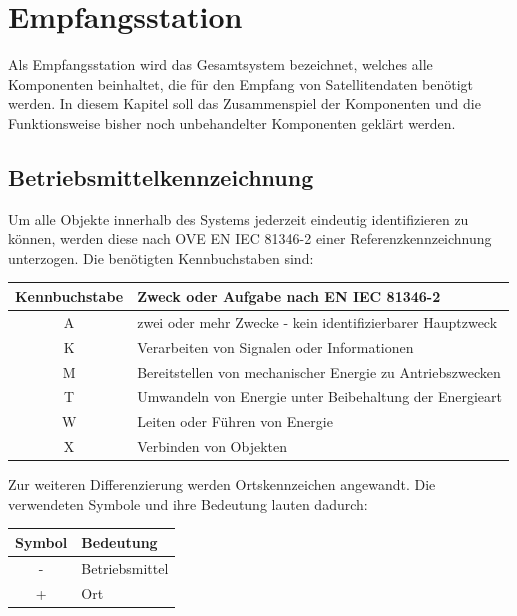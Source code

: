 \chapter{Empfangsstation}
Als Empfangsstation wird das Gesamtsystem bezeichnet, welches alle Komponenten beinhaltet, die für den Empfang von Satellitendaten benötigt werden. In diesem Kapitel soll das Zusammenspiel der Komponenten und die Funktionsweise bisher noch unbehandelter Komponenten geklärt werden.

\section{Betriebsmittelkennzeichnung}
\label{sec:bmk}
Um alle Objekte innerhalb des Systems jederzeit eindeutig identifizieren zu können, werden diese nach OVE EN IEC 81346-2 einer Referenzkennzeichnung unterzogen. Die benötigten Kennbuchstaben sind:

\begin{table}[H]
	\centering
	\begin{tabular}{|c|l|}
		\hline
		\textbf{Kennbuchstabe} & \textbf{Zweck oder Aufgabe nach EN IEC 81346-2} \\
		\hline
		A & zwei oder mehr Zwecke - kein identifizierbarer Hauptzweck \\
		\hline
		K & Verarbeiten von Signalen oder Informationen \\
		\hline
		M & Bereitstellen von mechanischer Energie zu Antriebszwecken \\
		\hline
		T & Umwandeln von Energie unter Beibehaltung der Energieart \\
		\hline
		W & Leiten oder Führen von Energie \\
		\hline
		X & Verbinden von Objekten \\
		\hline
	\end{tabular}
\end{table}

Zur weiteren Differenzierung werden Ortskennzeichen angewandt. Die verwendeten Symbole und ihre Bedeutung lauten dadurch:

\begin{table}[H]
	\centering
	\begin{tabular}{|c|l|}
		\hline
		\textbf{Symbol} & \textbf{Bedeutung} \\
		\hline
		- & Betriebsmittel \\
		\hline
		+ & Ort \\
		\hline
	\end{tabular}
\end{table}

